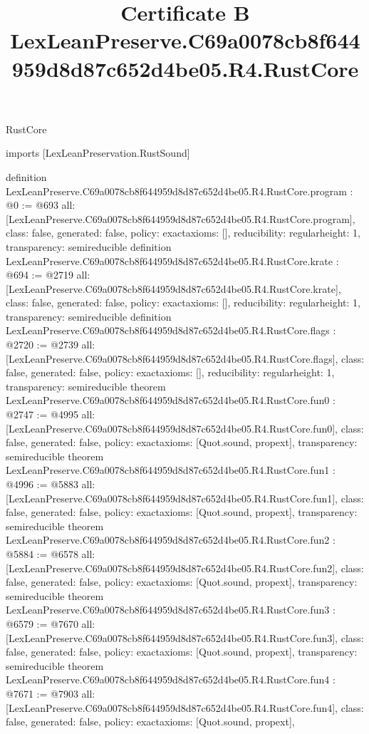 \begin{lexlean}{RustCore}
\title{Certificate B LexLeanPreserve.C69a0078cb8f644959d8d87c652d4be05.R4.RustCore}
\begin{coremodule}
imports [LexLeanPreservation.RustSound]

definition LexLeanPreserve.C69a0078cb8f644959d8d87c652d4be05.R4.RustCore.program : @0 := @693 {
  all: [LexLeanPreserve.C69a0078cb8f644959d8d87c652d4be05.R4.RustCore.program],
  class: false,
  generated: false,
  policy: exact{axioms: []},
  reducibility: regular{height: 1},
  transparency: semireducible
}
definition LexLeanPreserve.C69a0078cb8f644959d8d87c652d4be05.R4.RustCore.krate : @694 := @2719 {
  all: [LexLeanPreserve.C69a0078cb8f644959d8d87c652d4be05.R4.RustCore.krate],
  class: false,
  generated: false,
  policy: exact{axioms: []},
  reducibility: regular{height: 1},
  transparency: semireducible
}
definition LexLeanPreserve.C69a0078cb8f644959d8d87c652d4be05.R4.RustCore.flags : @2720 := @2739 {
  all: [LexLeanPreserve.C69a0078cb8f644959d8d87c652d4be05.R4.RustCore.flags],
  class: false,
  generated: false,
  policy: exact{axioms: []},
  reducibility: regular{height: 1},
  transparency: semireducible
}
theorem LexLeanPreserve.C69a0078cb8f644959d8d87c652d4be05.R4.RustCore.fun0 : @2747 := @4995 {
  all: [LexLeanPreserve.C69a0078cb8f644959d8d87c652d4be05.R4.RustCore.fun0],
  class: false,
  generated: false,
  policy: exact{axioms: [Quot.sound, propext]},
  transparency: semireducible
}
theorem LexLeanPreserve.C69a0078cb8f644959d8d87c652d4be05.R4.RustCore.fun1 : @4996 := @5883 {
  all: [LexLeanPreserve.C69a0078cb8f644959d8d87c652d4be05.R4.RustCore.fun1],
  class: false,
  generated: false,
  policy: exact{axioms: [Quot.sound, propext]},
  transparency: semireducible
}
theorem LexLeanPreserve.C69a0078cb8f644959d8d87c652d4be05.R4.RustCore.fun2 : @5884 := @6578 {
  all: [LexLeanPreserve.C69a0078cb8f644959d8d87c652d4be05.R4.RustCore.fun2],
  class: false,
  generated: false,
  policy: exact{axioms: [Quot.sound, propext]},
  transparency: semireducible
}
theorem LexLeanPreserve.C69a0078cb8f644959d8d87c652d4be05.R4.RustCore.fun3 : @6579 := @7670 {
  all: [LexLeanPreserve.C69a0078cb8f644959d8d87c652d4be05.R4.RustCore.fun3],
  class: false,
  generated: false,
  policy: exact{axioms: [Quot.sound, propext]},
  transparency: semireducible
}
theorem LexLeanPreserve.C69a0078cb8f644959d8d87c652d4be05.R4.RustCore.fun4 : @7671 := @7903 {
  all: [LexLeanPreserve.C69a0078cb8f644959d8d87c652d4be05.R4.RustCore.fun4],
  class: false,
  generated: false,
  policy: exact{axioms: [Quot.sound, propext]},
}
\end{coremodule}
\end{lexlean}
